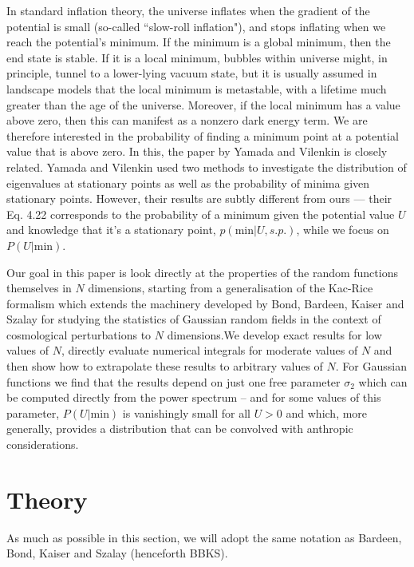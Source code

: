 \documentclass[12pt]{article}
\begin{document}
In standard inflation theory, the universe inflates when the gradient of the potential is small (so-called ``slow-roll inflation"), and stops inflating when we reach the potential's minimum. If the minimum is a global minimum, then the end state is stable. If it is  a local minimum, bubbles within universe might, in principle, tunnel to a lower-lying vacuum state, but it is usually assumed in landscape models that the local minimum is metastable, with a lifetime much greater than the age of the universe. Moreover, if the local minimum has a value above zero, then this can manifest as a nonzero dark energy term. We are therefore interested in the probability of finding a minimum point at a potential value that is above zero. In this, the paper by Yamada and Vilenkin \cite{Yamada2018} is closely related. Yamada and Vilenkin used two methods to investigate the distribution of eigenvalues at stationary points as well as the probability of minima given stationary points. However, their results are subtly different from ours --- their Eq. 4.22 corresponds to the probability of a minimum given the potential value $U$ and knowledge that it's a stationary point, $p(\mathrm{min}|U, s.p.)$, while we focus on $P(U|\mathrm{min})$.

Our goal in this paper is look directly at the properties of the random functions themselves in $N$ dimensions, starting from a generalisation of the Kac-Rice formalism \cite{Kac1943}\cite{Rice1945} which extends  the  machinery developed by Bond, Bardeen, Kaiser and Szalay for studying the statistics of Gaussian random fields in the context of cosmological perturbations to $N$ dimensions.We develop exact results for low values of $N$, directly evaluate numerical integrals for moderate values of $N$ and then show how to extrapolate these results to arbitrary values of $N$. For Gaussian functions we find that the results depend on just one free parameter $\sigma_2$ which can be computed directly from the power spectrum -- and for some values of this parameter, $P(U|\mathrm{min})$ is vanishingly small for all  $U> 0$ and which, more generally, provides a distribution that can be convolved with anthropic considerations.  

\section{Theory}

As much as possible in this section, we will adopt the same notation as Bardeen, Bond, Kaiser and Szalay (henceforth BBKS). \cite{BBKS}
\end{document}
